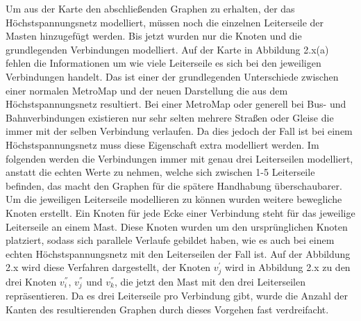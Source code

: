 Um aus der Karte den abschließenden Graphen zu erhalten, der das Höchstspannungsnetz modelliert, müssen noch die einzelnen Leiterseile der Masten hinzugefügt werden. Bis jetzt wurden nur die Knoten und die grundlegenden Verbindungen modelliert. Auf der Karte in Abbildung 2.x(a) fehlen die Informationen um wie viele Leiterseile es sich bei den jeweiligen Verbindungen handelt. Das ist einer der grundlegenden Unterschiede zwischen einer normalen MetroMap und der neuen Darstellung die aus dem Höchstspannungsnetz resultiert. Bei einer MetroMap oder generell bei Bus- und Bahnverbindungen existieren nur sehr selten mehrere Straßen oder Gleise die immer mit der selben Verbindung verlaufen. Da dies jedoch der Fall ist bei einem Höchstspannungsnetz muss diese Eigenschaft extra modelliert werden. Im folgenden werden die Verbindungen immer mit genau drei Leiterseilen modelliert, anstatt die echten Werte zu nehmen, welche sich zwischen 1-5 Leiterseile befinden, das macht den Graphen für die spätere Handhabung überschaubarer. \\


Um die jeweiligen Leiterseile modellieren zu können wurden weitere bewegliche Knoten erstellt. Ein Knoten für jede Ecke einer Verbindung steht für das jeweilige Leiterseile an einem Mast. Diese Knoten wurden um den ursprünglichen Knoten platziert, sodass sich parallele Verlaufe gebildet haben, wie es auch bei einem echten Höchstspannungsnetz mit den Leiterseilen der Fall ist. Auf der Abbildung 2.x wird diese Verfahren dargestellt, der Knoten $v_{j}^{'}$ wird in Abbildung 2.x zu den drei Knoten $v_{i}^{''}$, $v_{j}^{''}$ und $v_{k}^{''}$, die jetzt den Mast mit den drei Leiterseilen repräsentieren. Da es drei Leiterseile pro Verbindung gibt, wurde die Anzahl der Kanten des resultierenden Graphen durch dieses Vorgehen fast verdreifacht.  





